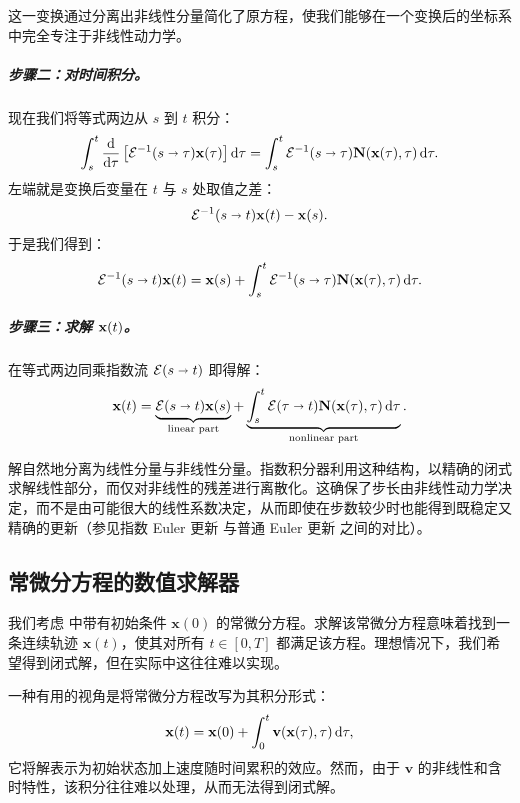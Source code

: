 这一变换通过分离出非线性分量简化了原方程，使我们能够在一个变换后的坐标系中完全专注于非线性动力学。

\subparagraph{步骤二：对时间积分。}
现在我们将等式两边从 $s$ 到 $t$ 积分：
\[
\int_s^t \frac{\mathop{}\!\mathrm{d}}{\mathop{}\!\mathrm{d} \tau} \left[ \mathcal{E}^{-1}(s \shortrightarrow \tau) {\mathbf{x}}(\tau) \right] \mathop{}\!\mathrm{d} \tau
= \int_s^t \mathcal{E}^{-1}(s \shortrightarrow \tau) {\mathbf{N}}({\mathbf{x}}(\tau), \tau)\mathop{}\!\mathrm{d} \tau.
\]
左端就是变换后变量在 $t$ 与 $s$ 处取值之差：
\[
\mathcal{E}^{-1}(s \shortrightarrow t) {\mathbf{x}}(t) - {\mathbf{x}}(s).
\]
于是我们得到：
\[
\mathcal{E}^{-1}(s \shortrightarrow t) {\mathbf{x}}(t)
= {\mathbf{x}}(s) + \int_s^t \mathcal{E}^{-1}(s \shortrightarrow \tau) {\mathbf{N}}({\mathbf{x}}(\tau), \tau)\mathop{}\!\mathrm{d} \tau.
\]

\subparagraph{步骤三：求解 ${\mathbf{x}}(t)$。}
在等式两边同乘指数流 $\mathcal{E}(s \shortrightarrow t)$ 即得解：
\begin{align}\label{eq:exp-int-factor-integration}
    {\mathbf{x}}(t) = \underbrace{\mathcal{E}(s \shortrightarrow t)  {\mathbf{x}}(s)}_{\text{linear part}} + \underbrace{\int_s^t \mathcal{E}(\tau \shortrightarrow t) {\mathbf{N}}({\mathbf{x}}(\tau), \tau)\mathop{}\!\mathrm{d} \tau}_{\text{nonlinear part}} .
\end{align}

解自然地分离为线性分量与非线性分量。指数积分器利用这种结构，以精确的闭式求解线性部分，而仅对非线性的残差进行离散化。这确保了步长由非线性动力学决定，而不是由可能很大的线性系数决定，从而即使在步数较少时也能得到既稳定又精确的更新（参见指数 Euler 更新  与普通 Euler 更新  之间的对比）。





\subsection{常微分方程的数值求解器}\label{app:de-solver}
我们考虑  中带有初始条件 $\mathbf{x}(0)$ 的常微分方程。求解该常微分方程意味着找到一条连续轨迹 $\mathbf{x}(t)$，使其对所有 $t \in [0, T]$ 都满足该方程。理想情况下，我们希望得到闭式解，但在实际中这往往难以实现。

一种有用的视角是将常微分方程改写为其积分形式：
\begin{equation}
\label{eq:integral_form}
\mathbf{x}(t) = \mathbf{x}(0) + \int_0^t \mathbf{v}(\mathbf{x}(\tau), \tau)\mathop{}\!\mathrm{d} \tau,
\end{equation}
它将解表示为初始状态加上速度随时间累积的效应。然而，由于 $\mathbf{v}$ 的非线性和含时特性，该积分往往难以处理，从而无法得到闭式解。


